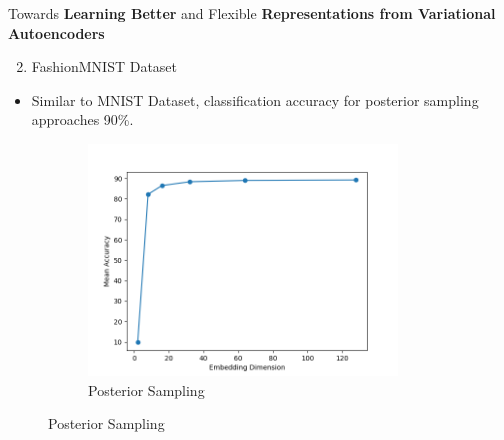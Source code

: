 \documentclass[hyperref={colorlinks,citecolor=blue,linkcolor=blue,urlcolor=blue}]{beamer}
\begin{document}
\begin{frame}{ Towards \textbf{Learning Better} and Flexible \textbf{Representations from Variational Autoencoders} \vspace{0.3em}}
  \begin{enumerate}
    \setcounter{enumi}{1}
    \item FashionMNIST Dataset
  \end{enumerate}
  \begin{itemize}
    \item Similar to MNIST Dataset, classification accuracy for posterior sampling approaches 90\%.
  \end{itemize}
  \begin{figure}
    \begin{subfigure}[b]{0.4\textwidth}
        \centering
        \includegraphics[width=0.9\textwidth,]{./Images/FashionMNIST_MMD_sampling.png}
        \caption{Posterior Sampling}
    \end{subfigure}
  \end{figure}
\end{frame}
\end{document}
